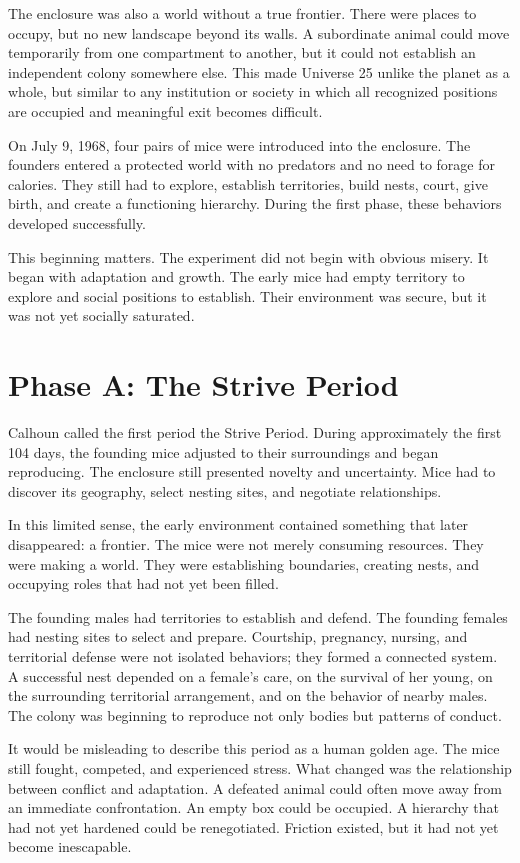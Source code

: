 ﻿\documentclass[12pt,a4paper]{book}
\begin{document}
The enclosure was also a world without a true frontier. There were places to occupy, but no new landscape beyond its walls. A subordinate animal could move temporarily from one compartment to another, but it could not establish an independent colony somewhere else. This made Universe 25 unlike the planet as a whole, but similar to any institution or society in which all recognized positions are occupied and meaningful exit becomes difficult.

On July 9, 1968, four pairs of mice were introduced into the enclosure. The founders entered a protected world with no predators and no need to forage for calories. They still had to explore, establish territories, build nests, court, give birth, and create a functioning hierarchy. During the first phase, these behaviors developed successfully.

This beginning matters. The experiment did not begin with obvious misery. It began with adaptation and growth. The early mice had empty territory to explore and social positions to establish. Their environment was secure, but it was not yet socially saturated.

\section{Phase A: The Strive Period}

Calhoun called the first period the Strive Period. During approximately the first 104 days, the founding mice adjusted to their surroundings and began reproducing. The enclosure still presented novelty and uncertainty. Mice had to discover its geography, select nesting sites, and negotiate relationships.

In this limited sense, the early environment contained something that later disappeared: a frontier. The mice were not merely consuming resources. They were making a world. They were establishing boundaries, creating nests, and occupying roles that had not yet been filled.

The founding males had territories to establish and defend. The founding females had nesting sites to select and prepare. Courtship, pregnancy, nursing, and territorial defense were not isolated behaviors; they formed a connected system. A successful nest depended on a female's care, on the survival of her young, on the surrounding territorial arrangement, and on the behavior of nearby males. The colony was beginning to reproduce not only bodies but patterns of conduct.

It would be misleading to describe this period as a human golden age. The mice still fought, competed, and experienced stress. What changed was the relationship between conflict and adaptation. A defeated animal could often move away from an immediate confrontation. An empty box could be occupied. A hierarchy that had not yet hardened could be renegotiated. Friction existed, but it had not yet become inescapable.
\end{document}
